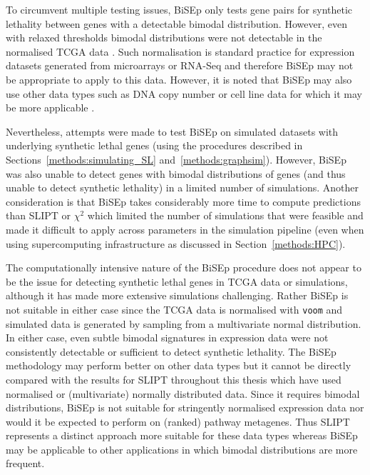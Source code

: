 To circumvent multiple testing issues, \gls{BiSEp} only tests gene pairs for synthetic lethality between genes with a detectable bimodal distribution. However, even with relaxed thresholds bimodal distributions were not detectable in the normalised TCGA data \citep{TCGA2012}. Such normalisation \cite{limma} is standard practice for expression datasets generated from microarrays or \gls{RNA-Seq} and therefore \gls{BiSEp} may not be appropriate to apply to this data. However, it is noted that \gls{BiSEp} may also use other data types such as DNA copy number or cell line data for which it may be more applicable \cite{Wappett2016}.

Nevertheless, attempts were made to test \gls{BiSEp} on simulated datasets with underlying synthetic lethal genes (using the procedures described in Sections~\ref{methods:simulating_SL} and~\ref{methods:graphsim}). However, \gls{BiSEp} was also unable to detect genes with bimodal distributions of genes (and thus unable to detect synthetic lethality) in a limited number of simulations. Another consideration is that \gls{BiSEp} takes considerably more time to compute predictions than \gls{SLIPT} or $\chi^2$ which limited the number of simulations that were feasible and made it difficult to apply across parameters in the simulation pipeline (even when using supercomputing infrastructure as discussed in Section~\ref{methods:HPC}).

The computationally intensive nature of the \gls{BiSEp} procedure does not appear to be the issue for detecting synthetic lethal genes in TCGA data or simulations, although it has made more extensive simulations challenging. Rather \gls{BiSEp} is not suitable in either case since the TCGA data is normalised with \texttt{voom} \citep{limma} and simulated data is generated by sampling from a multivariate normal distribution. In either case, even subtle bimodal signatures in expression data were not consistently detectable or sufficient to detect synthetic lethality. The \gls{BiSEp} methodology may perform better on other data types but it cannot be directly compared with the results for \gls{SLIPT} throughout this thesis which have used normalised or (multivariate) normally distributed data. Since it requires bimodal distributions, \gls{BiSEp} is not suitable for stringently normalised expression data nor would it be expected to perform on (ranked) pathway metagenes. Thus \gls{SLIPT} represents a distinct approach more suitable for these data types whereas \gls{BiSEp} may be applicable to other applications in which bimodal distributions are more frequent.

